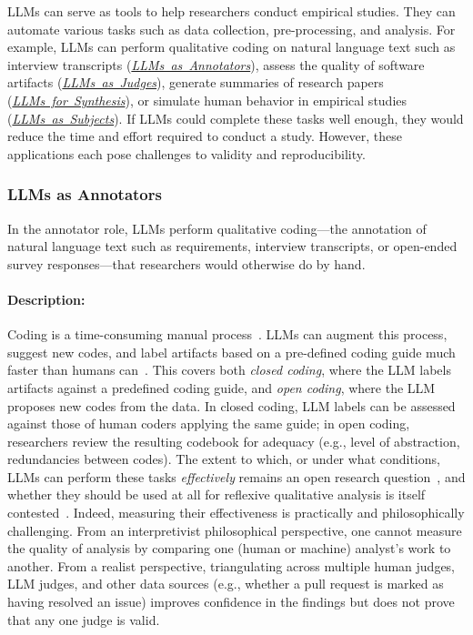 \documentclass[smallextended]{svjour3}
\newcommand{\annotators}{\hyperref[sec:llms-as-annotators]{\mbox{\emph{LLMs as Annotators}}}\xspace}
\newcommand{\judges}{\hyperref[sec:llms-as-judges]{\mbox{\emph{LLMs as Judges}}}\xspace}
\newcommand{\synthesis}{\hyperref[sec:llms-for-synthesis]{\mbox{\emph{LLMs for Synthesis}}}\xspace}
\newcommand{\subjects}{\hyperref[sec:llms-as-subjects]{\mbox{\emph{LLMs as Subjects}}}\xspace}
\newcommand{\annotators}{\href{/study-types/annotators/}{\emph{LLMs as Annotators}}\xspace}
\newcommand{\judges}{\href{/study-types/judges/}{\emph{LLMs as Judges}}\xspace}
\newcommand{\synthesis}{\href{/study-types/synthesis/}{\emph{LLMs for Synthesis}}\xspace}
\newcommand{\subjects}{\href{/study-types/subjects/}{\emph{LLMs as Subjects}}\xspace}
\newcommand{\studytypesubsection}[1]{\subsubsection{#1}}
\newcommand{\studytypeparagraph}[1]{\paragraph{\bfseries #1:}}
\newcommand{\studytypesubsection}[1]{\subsection{#1}}
\newcommand{\studytypeparagraph}[1]{\subsubsection{#1}}
\begin{document}
LLMs can serve as tools to help researchers conduct empirical studies.
They can automate various tasks such as data collection, pre-processing, and analysis.
For example, LLMs can perform qualitative coding on natural language text such as interview transcripts (\annotators), assess the quality of software artifacts (\judges), generate summaries of research papers (\synthesis), or simulate human behavior in empirical studies (\subjects). If LLMs could complete these tasks well enough, they would reduce the time and effort required to conduct a study. However, these applications each pose challenges to validity and reproducibility.
\space%

\studytypesubsection{LLMs as Annotators}
\label{sec:llms-as-annotators}

In the annotator role, LLMs perform qualitative coding---the annotation of natural language text such as requirements, interview transcripts, or open-ended survey responses---that researchers would otherwise do by hand.

\studytypeparagraph{Description}
Coding is a time-consuming manual process~\cite{DBLP:journals/ase/BanoHZT24}. LLMs can augment this process, suggest new codes, and label artifacts based on a pre-defined coding guide much faster than humans can~\cite{DBLP:conf/chi/HeHDRH24}. This covers both \emph{closed coding}, where the LLM labels artifacts against a predefined coding guide, and \emph{open coding}, where the LLM proposes new codes from the data. In closed coding, LLM labels can be assessed against those of human coders applying the same guide; in open coding, researchers review the resulting codebook for adequacy (e.g., level of abstraction, redundancies between codes).
The extent to which, or under what conditions, LLMs can perform these tasks \textit{effectively} remains an open research question~\cite{DBLP:conf/msr/AhmedDTP25}, and whether they should be used at all for reflexive qualitative analysis is itself contested~\cite{jowsey2025reject}. Indeed, measuring their effectiveness is practically and philosophically challenging. From an interpretivist philosophical perspective, one cannot measure the quality of analysis by comparing one (human or machine) analyst's work to another. From a realist perspective, triangulating across multiple human judges, LLM judges, and other data sources (e.g., whether a pull request is marked as having resolved an issue) improves confidence in the findings but does not prove that any one judge is valid.
\end{document}
